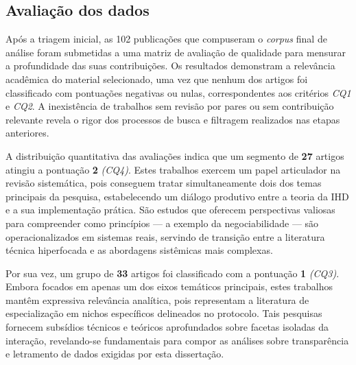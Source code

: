 \documentclass[
	12pt,				%
	oneside,			%
	a4paper,			%
	english,			%
	brazil				%
	]{abntex2ppgsi}
\begin{document}
 
 \subsection{Avaliação dos dados}

    Após a triagem inicial, as 102 publicações que compuseram o \textit{corpus} final de análise foram submetidas a uma matriz de avaliação de qualidade para mensurar a profundidade das suas contribuições. Os resultados demonstram a relevância acadêmica do material selecionado, uma vez que nenhum dos artigos foi classificado com pontuações negativas ou nulas, correspondentes aos critérios \textit{CQ1} e \textit{CQ2}. A inexistência de trabalhos sem revisão por pares ou sem contribuição relevante revela o rigor dos processos de busca e filtragem realizados nas etapas anteriores.

    A distribuição quantitativa das avaliações indica que um segmento de \textbf{27} artigos atingiu a pontuação \textbf{2} \textit{(CQ4)}. Estes trabalhos exercem um papel articulador na revisão sistemática, pois conseguem tratar simultaneamente dois dos temas principais da pesquisa, estabelecendo um diálogo produtivo entre a teoria da IHD e a sua implementação prática. São estudos que oferecem perspectivas valiosas para compreender como princípios — a exemplo da negociabilidade — são operacionalizados em sistemas reais, servindo de transição entre a literatura técnica hiperfocada e as abordagens sistêmicas mais complexas.

    Por sua vez, um grupo de \textbf{33} artigos foi classificado com a pontuação \textbf{1} \textit{(CQ3)}. Embora focados em apenas um dos eixos temáticos principais, estes trabalhos mantêm expressiva relevância analítica, pois representam a literatura de especialização em nichos específicos delineados no protocolo. Tais pesquisas fornecem subsídios técnicos e teóricos aprofundados sobre facetas isoladas da interação, revelando-se fundamentais para compor as análises sobre transparência e letramento de dados exigidas por esta dissertação.
\end{document}
